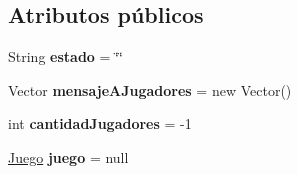 \subsection*{Atributos públicos}
\begin{DoxyCompactItemize}
\item 
\hypertarget{classBatallaEspacial_1_1Broadcaster_a3770fba2029f344833e6b21d922748d1}{
String {\bfseries estado} = \char`\"{}\char`\"{}}
\label{classBatallaEspacial_1_1Broadcaster_a3770fba2029f344833e6b21d922748d1}

\item 
\hypertarget{classBatallaEspacial_1_1Broadcaster_ac9d253113ff00d7e3663696a9dbbe5a8}{
Vector {\bfseries mensajeAJugadores} = new Vector()}
\label{classBatallaEspacial_1_1Broadcaster_ac9d253113ff00d7e3663696a9dbbe5a8}

\item 
\hypertarget{classBatallaEspacial_1_1Broadcaster_a1ac94a64cff74c32f13e36170f35e6fd}{
int {\bfseries cantidadJugadores} = -\/1}
\label{classBatallaEspacial_1_1Broadcaster_a1ac94a64cff74c32f13e36170f35e6fd}

\item 
\hypertarget{classBatallaEspacial_1_1Broadcaster_ae33d3c37ca42e99dd8fbd56d498eb312}{
\hyperlink{classBatallaEspacial_1_1Juego}{Juego} {\bfseries juego} = null}
\label{classBatallaEspacial_1_1Broadcaster_ae33d3c37ca42e99dd8fbd56d498eb312}

\end{DoxyCompactItemize}
